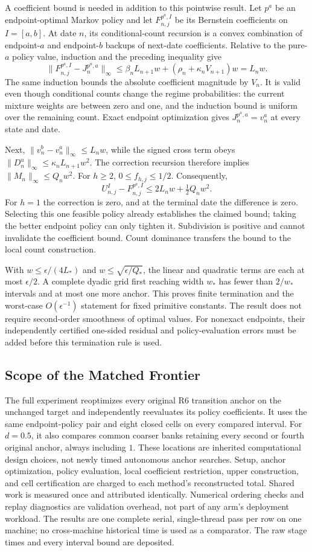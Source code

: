 A coefficient bound is needed in addition to this pointwise result. Let $p^a$ be an endpoint-optimal Markov policy and let $F^{p^a,I}_{n,j}$ be its Bernstein coefficients on $I=[a,b]$. At date $n$, its conditional-count recursion is a convex combination of endpoint-$a$ and endpoint-$b$ backups of next-date coefficients. Relative to the pure-$a$ policy value, induction and the preceding inequality give
\[
 \|F^{p^a,I}_{n,j}-J^{p^a,a}_n\|_\infty
 \leq\beta_nL_{n+1}w+(\rho_n+\kappa_nV_{n+1})w=L_nw.
\]
The same induction bounds the absolute coefficient magnitude by $V_n$. It is valid even though conditional counts change the regime probabilities: the current mixture weights are between zero and one, and the induction bound is uniform over the remaining count. Exact endpoint optimization gives $J^{p^a,a}_n=v^a_n$ at every state and date.

Next, $\|v_n^b-v_n^a\|_\infty\leq L_nw$, while the signed cross term obeys
$\|D_n^u\|_\infty\leq\kappa_nL_{n+1}w^2$.
The correction recursion therefore implies $\|M_n\|_\infty\leq Q_nw^2$.
For $h\geq2$, $0\leq f_{h,j}\leq1/2$. Consequently,
\[
 U^I_{n,j}-F^{p^a,I}_{n,j}
 \leq2L_nw+\tfrac12Q_nw^2.
\]
For $h=1$ the correction is zero, and at the terminal date the difference is zero. Selecting this one feasible policy already establishes the claimed bound; taking the better endpoint policy can only tighten it. Subdivision is positive and cannot invalidate the coefficient bound. Count dominance transfers the bound to the local count construction.

With $w\leq\epsilon/(4L_*)$ and $w\leq\sqrt{\epsilon/Q_*}$, the linear and quadratic terms are each at most $\epsilon/2$. A complete dyadic grid first reaching width $w_*$ has fewer than $2/w_*$ intervals and at most one more anchor. This proves finite termination and the worst-case $O(\epsilon^{-1})$ statement for fixed primitive constants. The result does not require second-order smoothness of optimal values. For nonexact endpoints, their independently certified one-sided residual and policy-evaluation errors must be added before this termination rule is used.

\subsection{Scope of the Matched Frontier}
The full experiment reoptimizes every original R6 transition anchor on the unchanged target and independently reevaluates its policy coefficients. It uses the same endpoint-policy pair and eight closed cells on every compared interval. For $d=0.5$, it also compares common coarser banks retaining every second or fourth original anchor, always including $1$. These locations are inherited computational design choices, not newly timed autonomous anchor searches. Setup, anchor optimization, policy evaluation, local coefficient restriction, upper construction, and cell certification are charged to each method's reconstructed total. Shared work is measured once and attributed identically. Numerical ordering checks and replay diagnostics are validation overhead, not part of any arm's deployment workload. The results are one complete serial, single-thread pass per row on one machine; no cross-machine historical time is used as a comparator. The raw stage times and every interval bound are deposited.
